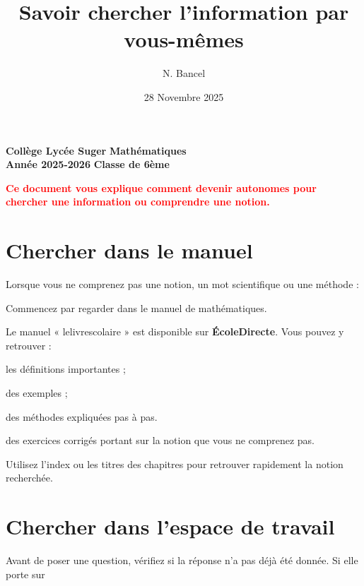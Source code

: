 \documentclass[answers]{exam}
\title{Savoir chercher l'information par vous-mêmes}
\author{N. Bancel}
\date{28 Novembre 2025}
\begin{document}
\textbf{Collège Lycée Suger}
\hfill
\textbf{Mathématiques} \\

\textbf{Année 2025-2026}
\hfill
\textbf{Classe de 6ème} \par

{\let\newpage\relax\maketitle}

\begin{center} \textbf{\textcolor{red}{Ce document vous explique comment devenir autonomes pour chercher une information ou comprendre une notion.}} \ \end{center}

\section{Chercher dans le manuel}

Lorsque vous ne comprenez pas une notion, un mot scientifique ou une méthode :

\begin{compactitem}
  \item Commencez par regarder dans le manuel de mathématiques.
  \item Le manuel « lelivrescolaire » est disponible sur \textbf{ÉcoleDirecte}. Vous pouvez y retrouver :
  \begin{compactitem}
    \item les définitions importantes ;
    \item des exemples ;
    \item des méthodes expliquées pas à pas.
    \item des exercices corrigés portant sur la notion que vous ne comprenez pas.
  \end{compactitem}
\item Utilisez l’index ou les titres des chapitres pour retrouver rapidement la notion recherchée.
\end{compactitem}

\section{Chercher dans l’espace de travail}

Avant de poser une question, vérifiez si la réponse n’a pas déjà été donnée. Si elle porte sur 
\end{document}
